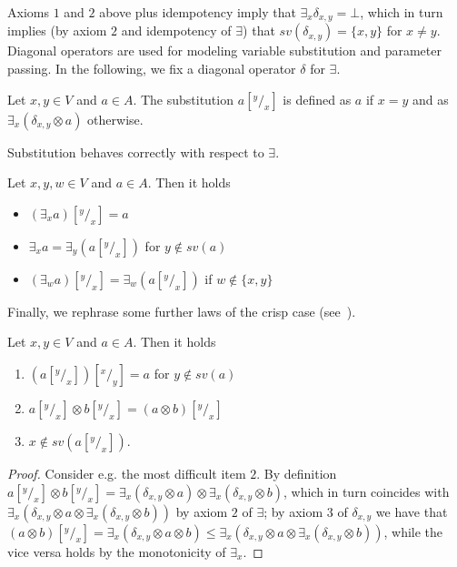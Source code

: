 \documentclass[main.tex]{subfiles}
\begin{document}
Axioms $1$ and $2$ above plus idempotency imply that $\exists_x \delta_{x,y} = \bot$,
which in turn implies (by axiom $2$ and idempotency of $\exists$) that $sv(\delta_{x,y}) = \{x,y\}$ for $x \neq y$.
%
Diagonal operators are used for modeling
variable substitution and parameter passing.
%
In the following, we fix a diagonal operator $\delta$ for $\exists$.

\begin{definition}[Substitution]
\label{def:sub}
Let $x, y \in V$ and $a \in A$.
%
The substitution $a[^y/_x]$ is defined as $a$ if $x = y$ and as
$\exists_x(\delta_{x,y} \otimes a)$ otherwise.
\end{definition}

Substitution behaves correctly with respect to $\exists$.

\begin{lemma}
\label{lemmaSubs0}
Let $x, y, w \in V$ and $a \in A$. Then it holds
\begin{itemize}
\item $(\exists_x a) [^y/_x] = a$
\item $\exists_x a = \exists_y (a [^y/_x])$ for $y \not \in sv(a)$
\item $(\exists_w a) [^y/_x] =  \exists_w (a [^y/_x])$ if $w \not \in \{x, y\}$
\end{itemize}
\end{lemma}

Finally, we rephrase some further laws of the crisp case 
(see~\cite[p.140]{pippo}).

\begin{lemma}
\label{lemmaSubs}
Let $x, y \in V$ and $a \in A$. Then it holds
\begin{enumerate}
\item $(a[^y/_x])[^x/_y] = a$ for $y \not \in sv(a)$
\item $a[^y/_x] \otimes b[^y/_x] = (a \otimes b)[^y/_x]$
\item $x \not \in sv(a[^y/_x])$.
\end{enumerate}
\end{lemma}
\begin{proof}
	Consider e.g. the most difficult item $2$.
	By definition $a[^y/_x] \otimes b[^y/_x] = \exists_x (\delta_{x,y} \otimes a) \otimes \exists_x (\delta_{x,y} \otimes b)$, which in turn coincides with $\exists_x (\delta_{x,y} \otimes a \otimes \exists_x (\delta_{x,y} \otimes b))$ by axiom $2$ of $\exists$; by axiom $3$ of $\delta_{x,y}$ we have that $(a \otimes b) [^y/_x] = \exists_x (\delta_{x,y} \otimes a \otimes b) \leq \exists_x (\delta_{x,y} \otimes a \otimes \exists_x (\delta_{x,y} \otimes b))$, while the vice versa holds by the monotonicity of $\exists_x$.
\end{proof}
\end{document}
